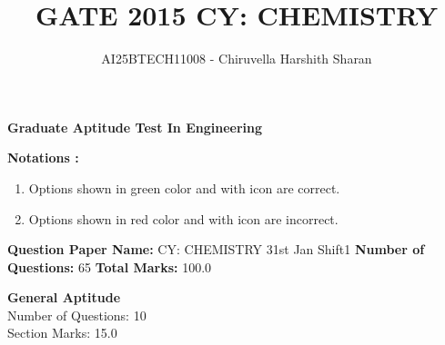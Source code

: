 \documentclass[journal,12pt,onecolumn]{exam}
\theoremstyle{remark}
\newcommand{\cross}{\textcolor{wrongred}{\ding{55}}}
\newcommand{\tick}{\textcolor{correctgreen}{\ding{51}}}
\begin{document}
\title{
GATE 2015
CY: CHEMISTRY}
\author{AI25BTECH11008 - Chiruvella Harshith Sharan}
\maketitle


\begin{center}
    \Large{\textbf{Graduate Aptitude Test In Engineering}}
\end{center}

\textbf{Notations :}

\begin{enumerate}
    \item Options shown in \textcolor{correctgreen}{green} color and with \tick{} icon are correct.
    \item Options shown in \textcolor{wrongred}{red} color and with \cross{} icon are incorrect.
\end{enumerate}

 

\textbf{Question Paper Name:} CY: CHEMISTRY 31st Jan Shift1
\textbf{Number of Questions:} 65
\textbf{Total Marks:} 100.0

 


 

\begin{center}
\textbf{General Aptitude} \\
Number of Questions: 10 \\
Section Marks: 15.0
\end{center}

 

\end{document}
